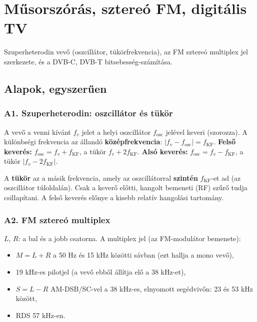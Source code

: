 \setcounter{chapter}{8}
\chapter{\texorpdfstring{Műsorszórás, sztereó FM, digitális TV}{Műsorszórás, sztereó FM, digitális TV}}\label{f9}
Szuperheterodin vevő (oszcillátor, tükörfrekvencia), az FM sztereó multiplex jel szerkezete, és a DVB-C, DVB-T bitsebesség-számítása.

\section{Alapok, egyszerűen}
\subsection{\texorpdfstring{A1. Szuperheterodin: oszcillátor és tükör}{A1. Szuperheterodin: oszcillátor és tükör}}\label{a9-szuper}
A vevő a venni kívánt $f_v$ jelet a helyi oszcillátor $f_\text{osc}$ jelével keveri (szorozza). A különbségi frekvencia az állandó \textbf{középfrekvencia}: $|f_v-f_\text{osc}|=f_\mathrm{KF}$. \textbf{Felső keverés:} $f_\text{osc}=f_v+f_\mathrm{KF}$, a tükör $f_v+2f_\mathrm{KF}$. \textbf{Alsó keverés:} $f_\text{osc}=f_v-f_\mathrm{KF}$, a tükör $|f_v-2f_\mathrm{KF}|$.

A \textbf{tükör} az a másik frekvencia, amely az oszcillátorral \textbf{szintén} $f_\mathrm{KF}$-et ad (az oszcillátor túloldalán). Csak a keverő előtti, hangolt bemeneti (RF) szűrő tudja csillapítani. A felső keverés előnye a kisebb relatív hangolási tartomány.

\subsection{\texorpdfstring{A2. FM sztereó multiplex}{A2. FM sztereó multiplex}}\label{a9-sztereo}
$L$, $R$: a bal és a jobb csatorna. A multiplex jel (az FM-modulátor bemenete):

\begin{itemize}
\item $M=L+R$ a 50 Hz és 15 kHz közötti sávban (ezt hallja a mono vevő),
\item 19 kHz-es pilotjel (a vevő ebből állítja elő a 38 kHz-et),
\item $S=L-R$ AM-DSB/SC-vel a 38 kHz-es, elnyomott segédvivőn: 23 és 53 kHz között,
\item RDS 57 kHz-en.
\end{itemize}

